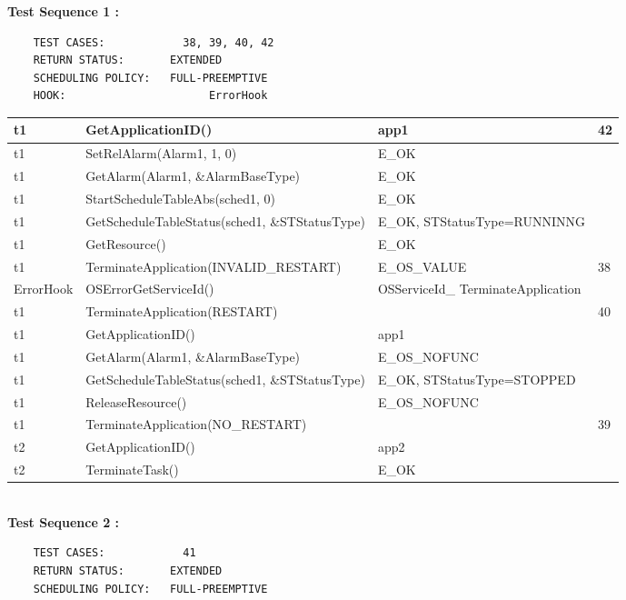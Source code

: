 \documentclass[10pt]{article}
\newlength{\Li}\settowidth{\Li}{Running}
\newlength{\Lii}\setlength{\Lii}{7cm}
\newlength{\Liiii}\setlength{\Liiii}{0.9cm}
\newlength{\Liii}\setlength{\Liii}{\textwidth} \addtolength{\Liii}{-\Li} \addtolength{\Liii}{-\Lii} \addtolength{\Liii}{-\Liiii}
\begin{document}
	\textbf{Test Sequence 1 :}
	\begin{lstlisting}
	TEST CASES:		       38, 39, 40, 42
	RETURN STATUS:	  	 EXTENDED
	SCHEDULING POLICY:   FULL-PREEMPTIVE
	HOOK:			           ErrorHook
	\end{lstlisting}
	
	
	\begin{supertabular}{|p{\Li}|p{\Lii}|p{\Liii}|p{\Liiii}|} \hline
	t1		& GetApplicationID()									& app1								& 42 \\ \hline
	t1		& SetRelAlarm(Alarm1, 1, 0)							& E\_OK								& \\ \hline
	t1		& GetAlarm(Alarm1, \&AlarmBaseType)					& E\_OK								& \\ \hline
	t1		& StartScheduleTableAbs(sched1, 0)					& E\_OK								& \\ \hline
	t1		& GetScheduleTableStatus(sched1, \&STStatusType)		& E\_OK, STStatusType=RUNNINNG		& \\ \hline
	t1		& GetResource()									& E\_OK								& \\ \hline
	t1		& TerminateApplication(INVALID\_RESTART)				& E\_OS\_VALUE						& 38 \\ \hline
	ErrorHook	& OSErrorGetServiceId()								& OSServiceId\_ TerminateApplication		& \\ \hline
	t1		& TerminateApplication(RESTART)						& 									& 40 \\ \hline
	
	t1		& GetApplicationID()									& app1								& \\ \hline
	t1		& GetAlarm(Alarm1, \&AlarmBaseType)					& E\_OS\_NOFUNC						& \\ \hline
	t1		& GetScheduleTableStatus(sched1, \&STStatusType)		& E\_OK, STStatusType=STOPPED			& \\ \hline
	t1		& ReleaseResource()								& E\_OS\_NOFUNC						& \\ \hline
	t1		& TerminateApplication(NO\_RESTART)					& 									& 39 \\ \hline
	
	t2		& GetApplicationID()									& app2								& \\ \hline
	t2		& TerminateTask()									& E\_OK								& \\ \hline
	\end{supertabular}\\
	
	\textbf{Test Sequence 2 :}
	\begin{lstlisting}
	TEST CASES:		       41
	RETURN STATUS:	  	 EXTENDED
	SCHEDULING POLICY:   FULL-PREEMPTIVE
	\end{lstlisting}
	
	
\end{document}
